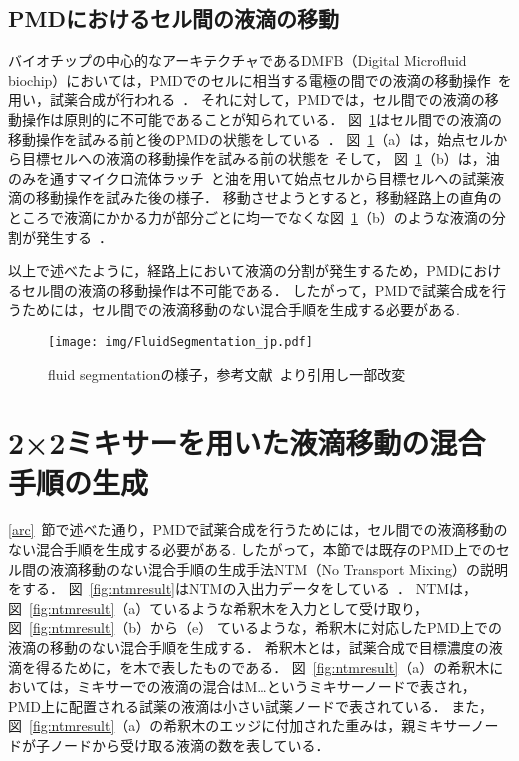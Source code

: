 \subsection{PMDにおけるセル間の液滴の移動}
バイオチップの中心的なアーキテクチャであるDMFB（Digital Microfluid biochip）においては，PMDでのセルに相当する電極の間での液滴の移動操作~\cite{B110474H}を用い，試薬合成が行われる~\cite{5605330}\cite{10.1007/s11047-006-9032-6}\cite{10.1145/2429384.2429464}．
それに対して，PMDでは，セル間での液滴の移動操作は原則的に不可能であることが知られている．
図~\ref{fig:fluidseg}はセル間での液滴の移動操作を試みる前と後のPMDの状態をしている~\cite{4}． 
図~\ref{fig:fluidseg}（a）は，始点セルから目標セルへの液滴の移動操作を試みる前の状態を
そして，
図~\ref{fig:fluidseg}（b）は，油のみを通すマイクロ流体ラッチ~\cite{urbanski2006digital}と油を用いて始点セルから目標セルへの試薬液滴の移動操作を試みた後の様子．
移動させようとすると，移動経路上の直角のところで液滴にかかる力が部分ごとに均一でなくな\mbox{図~\ref{fig:fluidseg}（b）}のような液滴の分割が発生する~\cite{FU2015343}．

以上で述べたように，経路上において液滴の分割が発生するため，PMDにおけるセル間の液滴の移動操作は不可能である．
したがって，PMDで試薬合成を行うためには，セル間での液滴移動のない混合手順を生成する必要がある.
\begin{figure}[tbp]
    \centering\texttt{[image: img/FluidSegmentation\_jp.pdf]}
 \caption{fluid segmentationの様子，参考文献~\cite{4}より引用し一部改変}\label{fig:fluidseg}
\end{figure}
\newpage
\section{{2×2ミキサーを用いた液滴移動の混合手順の生成}}
\ref{arc}~節で述べた通り，PMDで試薬合成を行うためには，セル間での液滴移動のない混合手順を生成する必要がある.
したがって，本節では既存のPMD上でのセル間の液滴移動のない混合手順の生成手法NTM（No Transport Mixing）の説明をする．
図~\ref{fig:ntmresult}はNTMの入出力データをしている~\cite{4}．
NTMは，図~\ref{fig:ntmresult}（a）ているような希釈木を入力として受け取り，図~\ref{fig:ntmresult}（b）から（e）
ているような，希釈木に対応したPMD上での液滴の移動のない混合手順を生成する．
希釈木とは，試薬合成で目標濃度の液滴を得るために，を木で表したものである．
図~\ref{fig:ntmresult}（a）の希釈木においては，ミキサーでの液滴の混合はM\ldots というミキサーノードで表され，
PMD上に配置される試薬の液滴は小さい試薬ノードで表されている．
また，図~\ref{fig:ntmresult}（a）の希釈木のエッジに付加された重みは，親ミキサーノードが子ノードから受け取る液滴の数を表している．

